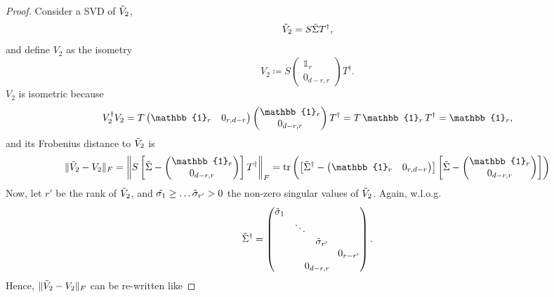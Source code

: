 \begin{proof}
Consider a SVD of $\Tilde{V}_2$,
\begin{equation*}
\Tilde{V}_2 = S\Tilde{\Sigma}T^{\dag},
\end{equation*} and define $V_2$ as the isometry
\begin{equation*}
V_2\coloneqq S \begin{pmatrix} \mathbb{1}_r \\ 0_{d-r,r} \end{pmatrix} T^{\dag}.
\end{equation*} $V_2$ is isometric because
\begin{equation*}
V_2^{\dag}V_2=T\begin{pmatrix} \mathbb{1}_r & 0_{r,d-r} \end{pmatrix} \begin{pmatrix} \mathbb{1}_r \\ 0_{d-r,r} \end{pmatrix} T^{\dag}=T\thinspace \mathbb{1}_r \thinspace T^{\dag} = \mathbb{1}_r,
\end{equation*}
and its Frobenius distance to $\Tilde{V}_2$ is
\begin{equation*}
\|\Tilde{V}_2-V_2\|_F = \left\|S\left[\Tilde{\Sigma}-\begin{pmatrix}
\mathbb{1}_r \\ 0_{d-r,r}\end{pmatrix}\right]T^{\dag}\right\|_F=\operatorname{tr}\left(\left[\Tilde{\Sigma}^{\dag}-\begin{pmatrix} \mathbb{1}_r & 0_{r,d-r}\end{pmatrix}\right]\left[\Tilde{\Sigma}-\begin{pmatrix} \mathbb{1}_r \\ 0_{d-r,r}\end{pmatrix}\right]\right)
\end{equation*}
Now, let $r'$ be the rank of $\Tilde{V}_2$, and $\Tilde{\sigma_1}\geq\dots\Tilde{\sigma}_{r'}>0$ the non-zero singular values of $\Tilde{V}_2$. Again, w.l.o.g.\
\begin{equation*}
\Tilde{\Sigma}^{\dag}=
\begin{pmatrix}
\Tilde{\sigma}_1 &&& \\
&\ddots&& \\
&&\Tilde{\sigma}_{r'}& \\
&&&0_{r-r'}\\[0.1em]
\multicolumn{4}{c}{0_{d-r,r}}
\end{pmatrix}.
\end{equation*}
Hence, $\|\Tilde{V}_2-V_2\|_F$ can be re-written like

\end{proof}
